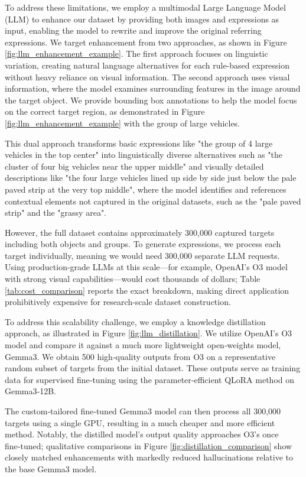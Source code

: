 To address these limitations, we employ a multimodal Large Language Model (LLM) to enhance our dataset by providing both images and expressions as input, enabling the model to rewrite and improve the original referring expressions. We target enhancement from two approaches, as shown in Figure \ref{fig:llm_enhancement_example}. The first approach focuses on linguistic variation, creating natural language alternatives for each rule-based expression without heavy reliance on visual information. The second approach uses visual information, where the model examines surrounding features in the image around the target object. We provide bounding box annotations to help the model focus on the correct target region, as demonstrated in Figure \ref{fig:llm_enhancement_example} with the group of large vehicles.

This dual approach transforms basic expressions like "the group of 4 large vehicles in the top center" into linguistically diverse alternatives such as "the cluster of four big vehicles near the upper middle" and visually detailed descriptions like "the four large vehicles lined up side by side just below the pale paved strip at the very top middle", where the model identifies and references contextual elements not captured in the original datasets, such as the "pale paved strip" and the "grassy area".

However, the full dataset contains approximately 300,000 captured targets including both objects and groups. To generate expressions, we process each target individually, meaning we would need 300,000 separate LLM requests. Using production-grade LLMs at this scale—for example, OpenAI’s O3 model with strong visual capabilities—would cost thousands of dollars; Table \ref{tab:cost_comparison} reports the exact breakdown, making direct application prohibitively expensive for research-scale dataset construction.

To address this scalability challenge, we employ a knowledge distillation approach, as illustrated in Figure \ref{fig:llm_distillation}. We utilize OpenAI’s O3 model and compare it against a much more lightweight open‑weights model, Gemma3. We obtain 500 high‑quality outputs from O3 on a representative random subset of targets from the initial dataset. These outputs serve as training data for supervised fine‑tuning using the parameter‑efficient QLoRA method on Gemma3‑12B.

The custom‑tailored fine‑tuned Gemma3 model can then process all 300,000 targets using a single GPU, resulting in a much cheaper and more efficient method. Notably, the distilled model’s output quality approaches O3’s once fine‑tuned; qualitative comparisons in Figure \ref{fig:distillation_comparison} show closely matched enhancements with markedly reduced hallucinations relative to the base Gemma3 model.

